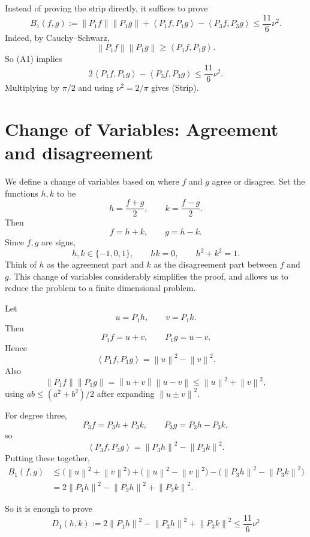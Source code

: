 \documentclass[11pt]{article}
\newcommand{\ip}[2]{\left\langle #1,#2\right\rangle}
\newcommand{\norm}[1]{\left\|#1\right\|}
\begin{document}
Instead of proving the strip directly, it suffices to prove
\begin{equation}
        B_1(f,g)
        :=\norm{P_1f}\norm{P_1g}
          +\ip{P_1f}{P_1g}
          -\ip{P_3f}{P_3g}
        \le \frac{11}{6}\nu^2.
        \tag{A1}
\end{equation}
Indeed, by Cauchy--Schwarz,
\[
        \norm{P_1f}\norm{P_1g}\ge \ip{P_1f}{P_1g}.
\]
So (A1) implies
\[
        2\ip{P_1f}{P_1g}-\ip{P_3f}{P_3g}\le \frac{11}{6}\nu^2.
\]
Multiplying by $\pi/2$ and using $\nu^2=2/\pi$ gives (Strip).

\section{Change of Variables: Agreement and disagreement}

We define a change of variables based on where $f$ and $g$ agree or disagree. Set the functions $h, k$ to be
\[
        h=\frac{f+g}{2},\qquad k=\frac{f-g}{2}.
\]
Then
\[
        f=h+k,
        \qquad
        g=h-k.
\]
Since $f,g$ are signs,
\[
        h,k\in\{-1,0,1\},
        \qquad
        hk=0,
        \qquad
        h^2+k^2=1.
\]
Think of $h$ as the agreement part and $k$ as the disagreement part between $f$ and $g$. This change of variables considerably simplifies the proof, and allows us to reduce the problem to a finite dimensional problem. 

Let
\[
        u=P_1h,\qquad v=P_1k.
\]
Then
\[
        P_1f=u+v,
        \qquad
        P_1g=u-v.
\]
Hence
\[
        \ip{P_1f}{P_1g}=\norm{u}^2-\norm{v}^2.
\]
Also
\[
        \norm{P_1f}\norm{P_1g}
        =\norm{u+v}\norm{u-v}
        \le \norm{u}^2+\norm{v}^2,
\]
using $ab\le(a^2+b^2)/2$ after expanding $\norm{u\pm v}^2$.

For degree three,
\[
        P_3f=P_3h+P_3k,
        \qquad
        P_3g=P_3h-P_3k,
\]
so
\[
        \ip{P_3f}{P_3g}=\norm{P_3h}^2-\norm{P_3k}^2.
\]
Putting these together,
\begin{align*}
        B_1(f,g)
        &\le
        \bigl(\norm{u}^2+\norm{v}^2\bigr)
        +\bigl(\norm{u}^2-\norm{v}^2\bigr)
        -\bigl(\norm{P_3h}^2-\norm{P_3k}^2\bigr)\\
        &=2\norm{P_1h}^2-\norm{P_3h}^2+\norm{P_3k}^2.
\end{align*}

So it is enough to prove
\begin{equation}
\boxed{\displaystyle
        D_1(h,k):=2\norm{P_1h}^2-\norm{P_3h}^2+\norm{P_3k}^2
        \le \frac{11}{6}\nu^2
}
\tag{HK1}
\end{equation}
\end{document}
